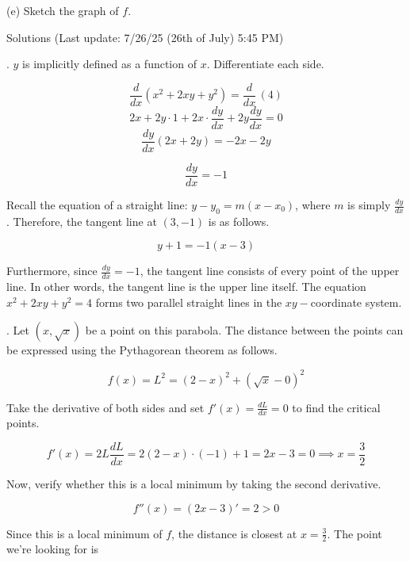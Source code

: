 \documentclass{article}
\begin{document}
\hfill

(e) Sketch the graph of $f$.

\newpage

\begin{center}
Solutions (Last update: 7/26/25 (26th of July) 5:45 PM)
\end{center}

. $y$ is implicitly defined as a function of $x$. Differentiate each side.

\[\frac{d}{dx}\left(x^2+2xy+y^2\right)=\frac{d}{dx}\,(4)\]
\[2x+2y\cdot1+2x\cdot\frac{dy}{dx}+2y\frac{dy}{dx}=0\]
\[\frac{dy}{dx}(2x+2y)=-2x-2y\]

\[\frac{dy}{dx}=-1\]

\hfill

\noindent Recall the equation of a straight line: $y-y_0=m(x-x_0)$, where $m$ is simply $\displaystyle \frac{dy}{dx}$. Therefore, the tangent line at $(3,-1)$ is as follows.

\[\boxed{y+1=-1(x-3)}\]

\hfill

\noindent Furthermore, since $\displaystyle \frac{dy}{dx}=-1$, the tangent line consists of every point of the upper line. In other words, the tangent line is the upper line itself. The equation $x^2+2xy+y^2=4$ forms two parallel straight lines in the $xy-$coordinate system.

\hfill

. Let $(x,\sqrt x)$ be a point on this parabola. The distance between the points can be expressed using the Pythagorean theorem as follows.

\[f(x)=L^2=(2-x)^2 + (\sqrt x - 0)^2\]

\hfill

\noindent Take the derivative of both sides and set $\displaystyle f'(x)=\frac{dL}{dx} = 0$ to find the critical points.

\begin{equation*}
f'(x)=2L\frac{dL}{dx}=2(2-x)\cdot(-1) + 1 = 2x-3=0 \implies x=\frac{3}2
\end{equation*}

\hfill

\noindent Now, verify whether this is a local minimum by taking the second derivative.

\[f''(x)=(2x-3)'=2>0\]

\noindent Since this is a local minimum of $f$, the distance is closest at $\displaystyle x=\frac32$. The point we're looking for is
\end{document}
